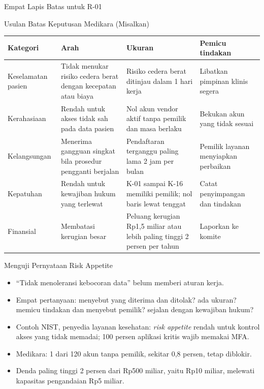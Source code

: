 \documentclass[aspectratio=169, table, 12pt]{beamer}
\begin{document}
\begin{frame}{{\Large Empat Lapis Batas untuk R-01}}
  \centering
  \vspace{2pt}
  \resizebox{\textwidth}{!}{}
\end{frame}

\begin{frame}{{\Large Usulan Batas Keputusan Medikara (Misalkan)}}
  \vspace{2pt}
  \scriptsize
  \begin{tabularx}{\textwidth}{|>{\raggedright\arraybackslash}p{}|>{\raggedright\arraybackslash}X|>{\raggedright\arraybackslash}X|>{\raggedright\arraybackslash}p{}|}
    \hline
    \textbf{Kategori} & \textbf{Arah} & \textbf{Ukuran} & \textbf{Pemicu tindakan} \\ \hline
    Keselamatan pasien & Tidak menukar risiko cedera berat dengan kecepatan atau biaya & Risiko cedera
    berat ditinjau dalam 1 hari kerja & Libatkan pimpinan klinis segera \\ \hline
    Kerahasiaan & Rendah untuk akses tidak sah pada data pasien & Nol akun vendor aktif tanpa pemilik
    dan masa berlaku & Bekukan akun yang tidak sesuai \\ \hline
    Kelangsungan & Menerima gangguan singkat bila prosedur pengganti berjalan & Pendaftaran terganggu
    paling lama 2 jam per bulan & Pemilik layanan menyiapkan perbaikan \\ \hline
    Kepatuhan & Rendah untuk kewajiban hukum yang terlewat & K-01 sampai K-16 memiliki pemilik; nol
    baris lewat tenggat & Catat penyimpangan dan tindakan \\ \hline
    Finansial & Membatasi kerugian besar & Peluang kerugian Rp1,5 miliar atau lebih paling tinggi 2
    persen per tahun & Laporkan ke komite \\ \hline
  \end{tabularx}
\end{frame}

\begin{frame}{{\Large Menguji Pernyataan Risk Appetite}}
  \vspace{6pt}
  \small
  \begin{itemize}
    \item ``Tidak menoleransi kebocoran data'' belum memberi aturan kerja.
    \item Empat pertanyaan: menyebut yang diterima dan ditolak? ada ukuran? memicu tindakan dan
          menyebut pemilik? sejalan dengan kewajiban hukum?
    \item Contoh NIST, penyedia layanan kesehatan: \textit{risk appetite} rendah untuk kontrol akses
          yang tidak memadai; 100 persen aplikasi kritis wajib memakai MFA.
    \item Medikara: 1 dari 120 akun tanpa pemilik, sekitar 0,8 persen, tetap diblokir.
    \item Denda paling tinggi 2 persen dari Rp500 miliar, yaitu Rp10 miliar, melewati kapasitas
          pengandaian Rp5 miliar.
  \end{itemize}
\end{frame}
\end{document}
